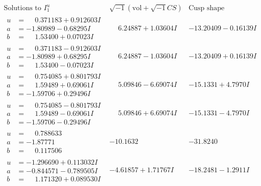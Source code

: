 \documentclass[1p]{elsarticle_modified}
\theoremstyle{definition}
\newcommand{\I}{\sqrt{-1}}
\begin{document}
$$\begin{array}{c|c|c}  
\text{Solutions to }I^u_{1}& \I (\text{vol} + \sqrt{-1}CS) & \text{Cusp shape}\\
 \hline 
\begin{aligned}
u &= \phantom{-}0.371183 + 0.912603 I \\
a &= -1.80989 - 0.68295 I \\
b &= \phantom{-}1.53400 + 0.07023 I\end{aligned}
 & \phantom{-}6.24887 + 1.03604 I & -13.20409 - 0.16139 I \\ \hline\begin{aligned}
u &= \phantom{-}0.371183 - 0.912603 I \\
a &= -1.80989 + 0.68295 I \\
b &= \phantom{-}1.53400 - 0.07023 I\end{aligned}
 & \phantom{-}6.24887 - 1.03604 I & -13.20409 + 0.16139 I \\ \hline\begin{aligned}
u &= \phantom{-}0.754085 + 0.801793 I \\
a &= \phantom{-}1.59489 + 0.69061 I \\
b &= -1.59706 + 0.29496 I\end{aligned}
 & \phantom{-}5.09846 - 6.69074 I & -15.1331 + 4.7970 I \\ \hline\begin{aligned}
u &= \phantom{-}0.754085 - 0.801793 I \\
a &= \phantom{-}1.59489 - 0.69061 I \\
b &= -1.59706 - 0.29496 I\end{aligned}
 & \phantom{-}5.09846 + 6.69074 I & -15.1331 - 4.7970 I \\ \hline\begin{aligned}
u &= \phantom{-}0.788633\phantom{ +0.000000I} \\
a &= -1.87771\phantom{ +0.000000I} \\
b &= \phantom{-}0.117506\phantom{ +0.000000I}\end{aligned}
 & -10.1632\phantom{ +0.000000I} & -31.8240\phantom{ +0.000000I} \\ \hline\begin{aligned}
u &= -1.296690 + 0.113032 I \\
a &= -0.844571 - 0.789505 I \\
b &= \phantom{-}1.171320 + 0.089530 I\end{aligned}
 & -4.61857 + 1.71767 I & -18.2481 - 1.2911 I \\ \hline\begin{aligned}

\end{aligned}
\end{array}$$
\end{document}
